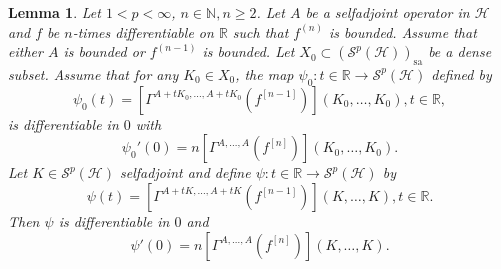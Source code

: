 \documentclass[12pt]{amsart}
\newtheorem{lemma}[theorem]{Lemma}
\theoremstyle{remark}
\newcommand{\N}{\mbox{${\mathbb N}$}}
\begin{document}
\begin{lemma}\label{simplification3}
Let $1 < p < \infty$, $n \in\N, n\geq 2$. Let $A$ be a selfadjoint operator in $\mathcal{H}$ and $f$ be $n$-times differentiable on $\mathbb{R}$ such that $f^{(n)}$ is bounded. Assume that either $A$ is bounded or $f^{(n-1)}$ is bounded. Let $X_0 \subset (\mathcal{S}^p(\mathcal{H}))_{\text{sa}}$ be a dense subset. Assume that for any $K_0 \in X_0$, the map $\psi_0 : t\in \mathbb{R} \to \mathcal{S}^p(\mathcal{H})$ defined by
$$
\psi_0(t) = \left[ \Gamma^{A+tK_0,\ldots,A+tK_0}(f^{[n-1]}) \right](K_0, \ldots, K_0), t\in \mathbb{R},
$$
is differentiable in $0$ with
$$
\psi_0'(0) = n \left[ \Gamma^{A,\ldots,A}(f^{[n]}) \right](K_0, \ldots, K_0).
$$
Let $K \in \mathcal{S}^p(\mathcal{H})$ selfadjoint and define $\psi : t\in \mathbb{R} \to \mathcal{S}^p(\mathcal{H})$ by
$$
\psi(t) = \left[ \Gamma^{A+tK,\ldots,A+tK}(f^{[n-1]}) \right](K, \ldots, K), t\in \mathbb{R}.
$$
Then $\psi$ is differentiable in $0$ and
$$
\psi'(0) = n \left[ \Gamma^{A,\ldots,A}(f^{[n]}) \right](K, \ldots, K).
$$
\end{lemma}
\end{document}

